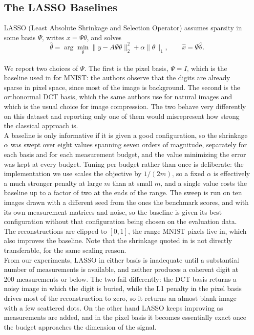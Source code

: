 \subsection{The LASSO Baselines}

LASSO (Least Absolute Shrinkage and Selection Operator) assumes sparsity in some basis \( \Psi \), writes \( x = \Psi\theta \), and solves
\begin{equation}
\hat{\theta} = \arg \min_\theta \|y - A\Psi\theta\|_2^2 + \alpha \|\theta\|_1, \qquad \hat{x} = \Psi\hat{\theta} .
\end{equation}
\\
We report two choices of \( \Psi \). The first is the pixel basis, \( \Psi = I \), which is the baseline used in \cite{bora2017} for MNIST: the authors observe that the digits are already sparse in pixel space, since most of the image is background. The second is the orthonormal DCT basis, which the same authors use for natural images and which is the usual choice for image compression. The two behave very differently on this dataset and reporting only one of them would misrepresent how strong the classical approach is.
\\
A baseline is only informative if it is given a good configuration, so the shrinkage \( \alpha \) was swept over eight values spanning seven orders of magnitude, separately for each basis and for each measurement budget, and the value minimizing the error was kept at every budget. Tuning per budget rather than once is deliberate: the implementation we use scales the objective by \( 1/(2m) \), so a fixed \( \alpha \) is effectively a much stronger penalty at large \( m \) than at small \( m \), and a single value costs the baseline up to a factor of two at the ends of the range. The sweep is run on ten images drawn with a different seed from the ones the benchmark scores, and with its own measurement matrices and noise, so the baseline is given its best configuration without that configuration being chosen on the evaluation data. The reconstructions are clipped to \( [0,1] \), the range MNIST pixels live in, which also improves the baseline. Note that the shrinkage quoted in \cite{bora2017} is not directly transferable, for the same scaling reason.
\\
From our experiments, LASSO in either basis is inadequate until a substantial number of measurements is available, and neither produces a coherent digit at 200 measurements or below. The two fail differently: the DCT basis returns a noisy image in which the digit is buried, while the L1 penalty in the pixel basis drives most of the reconstruction to zero, so it returns an almost blank image with a few scattered dots. On the other hand LASSO keeps improving as measurements are added, and in the pixel basis it becomes essentially exact once the budget approaches the dimension of the signal.

